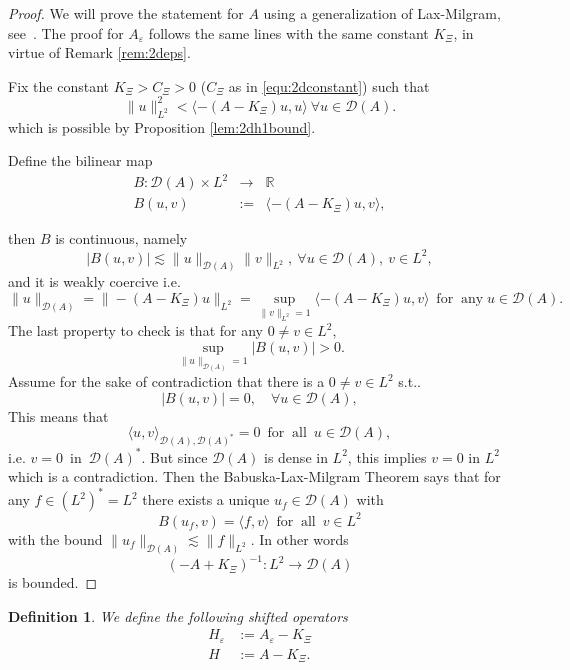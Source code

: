 \documentclass[11pt, oneside]{article}   	%
\newcommand{\assign}{:=}
\newcommand{\tmop}[1]{\ensuremath{\operatorname{#1}}}
\newtheorem{definition}[theorem]{Definition}
\begin{document}
\begin{proof}
	We will prove the statement for $A$ using a generalization of Lax-Milgram, see~\cite{bab71}.  The proof for $A_\varepsilon$ follows the same lines with the same constant $K_\Xi$, in virtue of Remark \ref{rem:2deps}.
	
	

	{{Fix the constant $K_{\Xi} > C_{\Xi}  > 0$ ($C_{\Xi}$ as in \eqref{equ:2dconstant}) such that }}
	\[ \| u \|^2_{L^2} < \langle - (A - K_{\Xi}) u, u \rangle \ \forall u \in \mathscr{D}
	(A). \]
	{ which is possible by Proposition \ref{lem:2dh1bound}.}
	
	{{Define the bilinear map }}
	\begin{eqnarray*}
		B : \mathscr{D} (A) \times L^2 & \rightarrow & \mathbb{R}\\
		B (u, v) & \assign &  \langle - (A - K_{\Xi}) u, v \rangle,
	\end{eqnarray*}
	
	{{then $B$ is continuous, namely}}
	\[ | B (u, v) | \lesssim \| u \|_{\mathscr{D} (A)} \| v \|_{L^2}, \ \forall u
	\in \mathscr{D} (A), \  v \in L^2, \]
	{{and it is {{weakly coercive}} i.e.}}
	\[ \| u \|_{\mathscr{D} (A)} = \| - (A - K_{\Xi}) u \|_{L^2} = \underset{\| v
		\|_{L^2} = 1}{\sup}  \langle - (A - K_{\Xi}) u, v \rangle \ \tmop{for} \tmop{any} u \in
	\mathscr{D} (A) . \]
	{{The last property to check is that for any $0 \neq v \in L^2$,}}
	\[ \underset{\| u \|_{\mathscr{D} (A)} = 1}{\sup} | B (u, v) | > 0. \]
	{{Assume for the sake of contradiction that there is a $0 \neq v \in
			L^2$ s.t.}.}
	\[ | B (u, v) | = 0,  \quad \forall u \in \mathscr{D} (A), \]
	{{This means that}}
	\[ \langle u, v \rangle_{\mathscr{D} (A), \mathscr{D} (A)^{\ast}} = 0
	\ \tmop{for} \tmop{all} \ u \in \mathscr{D} (A), \]
	{{i.e. $v = 0 \ \tmop{in} \  \mathscr{D} (A)^{\ast} .$ But since
			$\mathscr{D} (A)$ is dense in $L^2$, this implies $v = 0$ in $L^2 $ which is a
			contradiction.}}
	{{Then the Babuska-Lax-Milgram Theorem says that for any $f \in
			(L^2)^{\ast} = L^2$ there exists a unique $u_f \in \mathscr{D} (A)$ with }}
	\[ B (u_f, v) = \langle f, v \rangle \ \tmop{for} \tmop{all} \  v \in L^2 \]
	{{with the bound $\| u_f \|_{\mathscr{D} (A)} \lesssim \| f \|_{L^2} .$
			In other words}}
	\[ (- A + K_{\Xi})^{- 1} : L^2 \rightarrow \mathscr{D}
	(A) \] is bounded.
\end{proof}




\begin{definition} \label{def:setconstant}
	We define the following shifted operators
	\begin{align*}
	H_\varepsilon & :=   A_\varepsilon - K_\Xi \\
	H & := A -  K_\Xi.  \\
	\end{align*}
	\end{definition}
\end{document}
